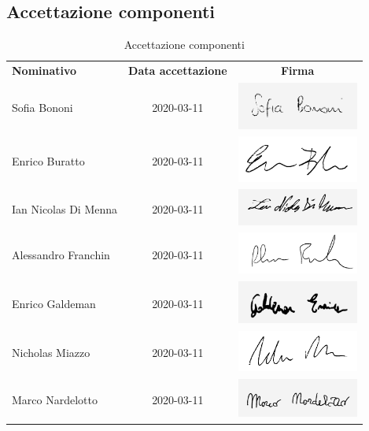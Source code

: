 \documentclass[../piano-di-progetto.tex]{subfiles}
\begin{document}
  \subsection{Accettazione componenti}

  \begin{table}[H]
    \centering
    \begin{tabular}{lcc}
      \rowcolor{lightgray}
      \textbf{Nominativo}  & \textbf{Data accettazione} & \textbf{Firma}  \\
      Sofia Bononi & 2020-03-11 & \includegraphics[width=4cm]{img/sofia-g.png} \\
      Enrico Buratto & 2020-03-11 & \includegraphics[width=4cm]{img/enricob.png}     \\
      Ian Nicolas Di Menna & 2020-03-11 & \includegraphics[width=4cm]{img/ian-g.png}     \\
      Alessandro Franchin & 2020-03-11 & \includegraphics[width=4cm]{img/ale.png}     \\
      Enrico Galdeman & 2020-03-11 & \includegraphics[width=4cm]{img/enricog-g.png}     \\
      Nicholas Miazzo & 2020-03-11 & \includegraphics[width=4cm]{img/nicholas.png}     \\
      Marco Nardelotto & 2020-03-11 & \includegraphics[width=4cm]{img/marco-g.png}
    \end{tabular}
    \caption{Accettazione componenti}
  \end{table}
\end{document}
